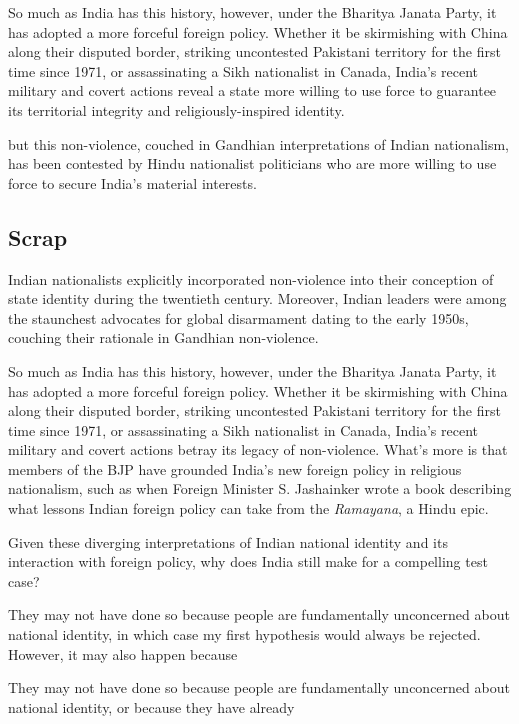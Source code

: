\documentclass[12pt]{article}
\begin{document}
So much as India has this history, however, under the Bharitya Janata Party, it has adopted a more forceful foreign policy. Whether it be skirmishing with China along their disputed border, striking uncontested Pakistani territory for the first time since 1971, or assassinating a Sikh nationalist in Canada, India's recent military and covert actions reveal a state more willing to use force to guarantee its territorial integrity and religiously-inspired identity. 

but this non-violence, couched in Gandhian interpretations of Indian nationalism, has been contested by Hindu nationalist politicians who are more willing to use force to secure India's material interests.

\subsection{Scrap}

Indian nationalists explicitly incorporated non-violence into their conception of state identity during the twentieth century. Moreover, Indian leaders were among the staunchest advocates for global disarmament dating to the early 1950s, couching their rationale in Gandhian non-violence. 

So much as India has this history, however, under the Bharitya Janata Party, it has adopted a more forceful foreign policy. Whether it be skirmishing with China along their disputed border, striking uncontested Pakistani territory for the first time since 1971, or assassinating a Sikh nationalist in Canada, India's recent military and covert actions betray its legacy of non-violence. What's more is that members of the BJP have grounded India's new foreign policy in religious nationalism, such as when Foreign Minister S. Jashainker wrote a book describing what lessons Indian foreign policy can take from the \textit{Ramayana}, a Hindu epic.

Given these diverging interpretations of Indian national identity and its interaction with foreign policy, why does India still make for a compelling test case? 

They may not have done so because people are fundamentally unconcerned about national identity, in which case my first hypothesis would always be rejected. However, it may also happen because 

They may not have done so because people are fundamentally unconcerned about national identity, or because they have already 
\end{document}
